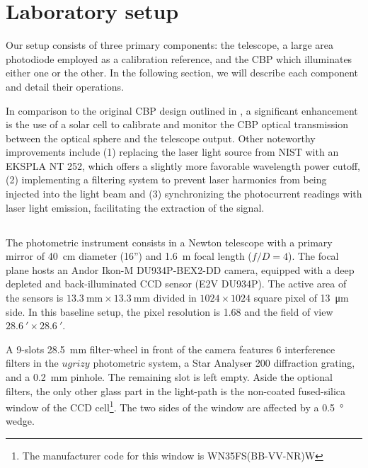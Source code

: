 \section{Laboratory setup}
\label{sec:setup}

Our setup consists of three primary components: the \SD telescope, a
large area photodiode employed as a calibration reference, and the CBP
which illuminates either one or the other. In the following section,
we will describe each component and detail their operations.

In comparison to the original CBP design outlined in
\cite{Mondrik_2023}, a significant enhancement is the use of a solar
cell to calibrate and monitor the CBP optical transmission between the
optical sphere and the telescope output. Other noteworthy improvements
include (1) replacing the laser light source from NIST with an EKSPLA
NT 252, which offers a slightly more favorable wavelength power
cutoff, (2) implementing a filtering system to prevent laser harmonics
from being injected into the light beam and (3) synchronizing the
photocurrent readings with laser light emission, facilitating the
extraction of the signal.

\subsection{\SD}
\label{sec:stardice}

The \SD photometric instrument consists in a Newton
telescope with a primary mirror of \SI{40}{\centi\meter} diameter
(16'') and \SI{1.6}{\meter} focal length ($f/D = 4$). The focal plane
hosts an Andor Ikon-M DU934P-BEX2-DD camera, equipped with a deep
depleted and back-illuminated CCD sensor (E2V DU934P). The active area
of the sensors is
$\SI{13.3}{\milli\meter}\times\SI{13.3}{\milli\meter}$ divided in
$1024\times 1024$ square pixel of \SI{13}{\micro\meter} side. In this
baseline setup, the pixel resolution is \SI{1.68}{\arcsec} and the
field of view $\SI{28.6}{\arcmin}\times\SI{28.6}{\arcmin}$.

A 9-slots \SI{28.5}{\milli\meter} filter-wheel in front of the camera
features 6 interference filters in the $ugrizy$ photometric system, a
Star Analyser 200 diffraction grating, and a \SI{0.2}{\milli\meter}
pinhole. The remaining slot is left empty. Aside the optional filters,
the only other glass part in the light-path is the non-coated
fused-silica window of the CCD cell\footnote{The manufacturer code for
  this window is WN35FS(BB-VV-NR)W}. The two sides of the window are
affected by a \SI{0.5}{\degree} wedge.

